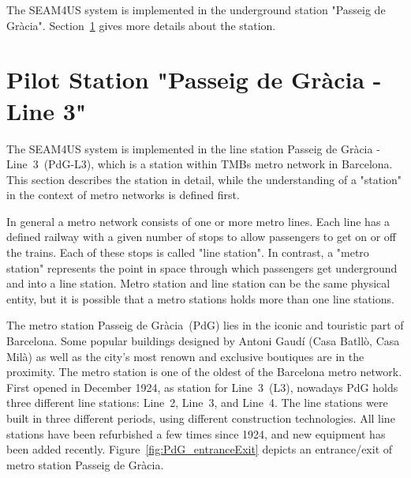 The SEAM4US system is implemented in the underground station "Passeig de Gr\`{a}cia". Section~\ref{sec:station} gives more details about the station.


\section{Pilot Station "Passeig de Gr\`{a}cia - Line 3"}
\label{sec:station}


The SEAM4US system is implemented in the line station Passeig de Gr\`{a}cia - Line~3~(PdG-L3), which is a station within TMBs metro network in Barcelona. This section describes the station in detail, while the understanding of a "station" in the context of metro networks is defined first.

In general a metro network consists of one or more metro lines. Each line has a defined railway with a given number of stops to allow passengers to get on or off the trains. Each of these stops is called "line station". In contrast, a "metro station" represents the point in space through which passengers get underground and into a line station. Metro station and line station can be the same physical entity, but it is possible that a metro stations holds more than one line stations.

The metro station Passeig de Gr\`{a}cia~(PdG) lies in the iconic and touristic part of Barcelona. Some popular buildings designed by Antoni Gaud\'{i} (Casa Batll\`{o}, Casa Mil\`{a}) as well as the city's most renown and exclusive boutiques are in the proximity.
The metro station is one of the oldest of the Barcelona metro network. First opened in December 1924, as station for Line~3~(L3), nowadays PdG holds three different line stations: Line~2, Line~3, and Line~4. The line stations were built in three different periods, using different construction technologies. All line stations have been refurbished a few times since 1924, and new equipment has been added recently. Figure~\ref{fig:PdG_entranceExit} depicts an entrance/exit of metro station Passeig de Gr\`{a}cia.

